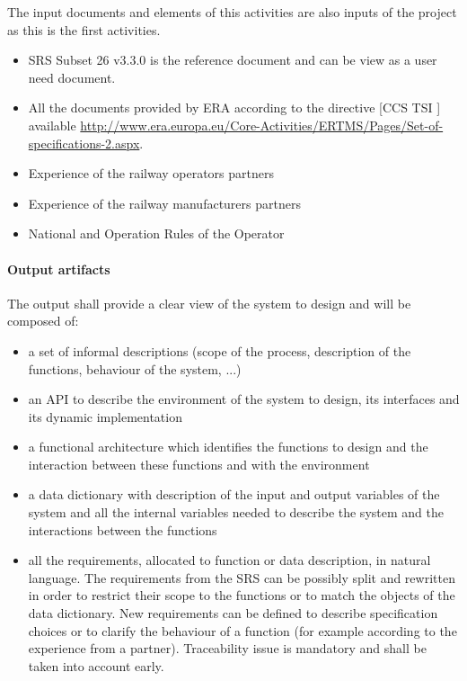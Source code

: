 The input documents and elements of this activities are also inputs of the project as this is the first activities.
\begin{itemize}
\item SRS Subset 26 v3.3.0 is the reference document and can be view as a user need document.
\item All the documents provided by ERA according to the directive [CCS TSI ] available \url{http://www.era.europa.eu/Core-Activities/ERTMS/Pages/Set-of-specifications-2.aspx}.
\item Experience of the railway operators partners
\item Experience of the railway manufacturers partners
\item National and Operation Rules of the Operator
\end{itemize}

\paragraph{Output artifacts}

The output shall provide a clear view of the system to design and will be composed of:

\begin{itemize}
\item a set of informal descriptions (scope of the process, description of the functions, behaviour of the system, ...)
\item  an API to  describe the environment of the system to design, its interfaces and its dynamic implementation
\item a functional architecture which identifies the functions to design and the interaction between these functions and with the environment
\item a data dictionary with description of the input and output variables of the system and all the internal variables needed to  describe the system and the interactions between the functions
\item all the requirements, allocated to function or data description, in natural language. The requirements from the SRS can be possibly split and rewritten in order to restrict their scope to the functions or to match the objects of the data dictionary. New requirements can be defined to describe specification choices or to clarify the behaviour of a function (for example according to the experience from a partner). Traceability issue is mandatory and shall be taken into account early.

\end{itemize}

